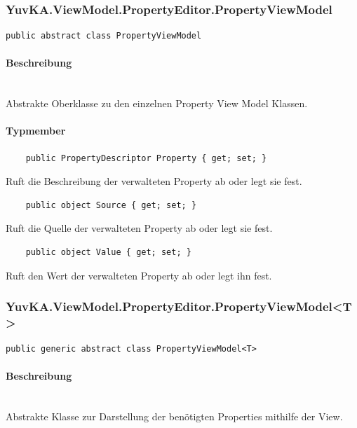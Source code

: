 \subsubsection{YuvKA.ViewModel.PropertyEditor.PropertyViewModel}

\begin{verbatim}
public abstract class PropertyViewModel
\end{verbatim}

\paragraph{Beschreibung}~\\
Abstrakte Oberklasse zu den einzelnen Property View Model Klassen.

\paragraph{Typmember}
\begin{itemize}
 	
	\begin{verbatim}
	public PropertyDescriptor Property { get; set; }
	\end{verbatim}
	Ruft die Beschreibung der verwalteten Property ab oder legt sie fest.

	\begin{verbatim}
	public object Source { get; set; }
	\end{verbatim}
	Ruft die Quelle der verwalteten Property ab oder legt sie fest.

	\begin{verbatim}
	public object Value { get; set; }
	\end{verbatim}
	Ruft den Wert der verwalteten Property ab oder legt ihn fest.

\end{itemize}




\subsubsection{YuvKA.ViewModel.PropertyEditor.PropertyViewModel\textless T\textgreater}

\begin{verbatim}
public generic abstract class PropertyViewModel<T>
\end{verbatim}

\paragraph{Beschreibung}~\\
Abstrakte Klasse zur Darstellung der benötigten Properties mithilfe der View.

